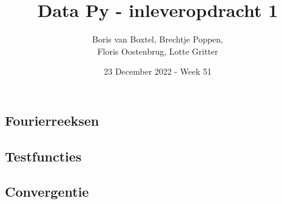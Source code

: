 \documentclass[12pt, dutch, a4paper]{article}
\title{Data Py - inleveropdracht 1}
\author{Boris van Boxtel, Brechtje Poppen, \\  Floris Oostenbrug, Lotte Gritter}
\date{23 December 2022 - Week 51}
\theoremstyle{definition}
\begin{document}
\maketitle  
{} 

\subsection*{Fourierreeksen}



\subsection*{Testfuncties}
\subsection*{Convergentie}
\end{document}
